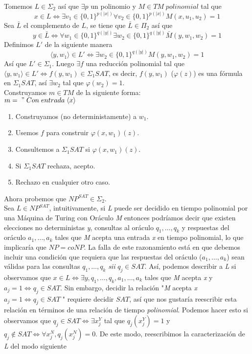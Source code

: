 \documentclass[12pt]{article}
\begin{document}
\fbox{\textbf{$\subseteq$}} Tomemos $L \in \Sigma_2$ así que $\exists p$ un polinomio y $M \in TM \; polinomial$ tal que
\begin{equation*}
x \in L \iff \exists v_1 \in \{ 0,1 \}^{p(|x|)} \forall v_2 \in \{ 0,1 \}^{p(|x|)} M(x,u_1,u_2) = 1  
\end{equation*}
Sea $\bar{L}$ el complemento de $L$, se tiene que $\bar{L} \in \Pi_2$ así que
\begin{equation*}
y \in \bar{L} \iff \forall w_1 \in \{ 0,1 \}^{q(|y|)} \exists w_2 \in \{ 0,1 \}^{q(|y|)} \bar{M}(y,w_1,w_2) = 1
\end{equation*}
Definimos $L'$ de la siguiente manera
\begin{equation*}
\langle y,w_1 \rangle \in L' \iff \exists w_2 \in \{ 0,1 \}^{q(|y|)} M(y,w_1, w_2) = 1
\end{equation*}
Así que $L' \in \Sigma_1$. Luego $\exists f$ una reducción polinomial tal que $\langle y, w_1 \rangle \in L' \iff f(y,w_1) \in \Sigma_1SAT$, es decir, $f(y,w_1)$ ($\varphi(z)$) es una fórmula en $\Sigma_1SAT$, así $\exists w_2$ tal que $\varphi(w_2) = 1$. \\
Construyamos $m \in TM$ de la siguiente forma: \\
$m = \; " \; Con \; entrada \; \langle x \rangle$ 
\begin{enumerate}
\item Construyamos (no deterministamente) a $w_1$.
\item Usemos $f$ para construir $\varphi(x,w_1)(z)$.
\item Consultemos a $\Sigma_1SAT$ si $\varphi(x,w_1)(z)$.
\item Si $\Sigma_1SAT$ rechaza, acepto.
\item Rechazo en cualquier otro caso.
\end{enumerate}
\fbox{\textbf{$\supseteq$}} Ahora probemos que $NP^{SAT} \in \Sigma_2$.\\
Sea $L \in NP^{SAT}$, intuitivamente, si \textit{L} puede ser decidido en tiempo polinomial por una Máquina de Turing con Oráculo \textit{M} entonces podríamos decir que existen elecciones no deterministas \textit{y}, consultas al oráculo $q_1, \dots, q_k$ y respuestas del oráculo $ a_1, \dots, a_k$ tales que \textit{M} acepta una entrada \textit{x} en tiempo polinomial, lo que implicaría que $NP = coNP$. La falla de este razonamiento está en que debemos incluir una condición que requiera que las respuestas del oráculo ($ a_1, \dots, a_k$) sean válidas para las consultas $q_1, \dots, q_k$ \textit{sii} $q_j \in SAT$. Así, podemos describir a \textit{L} si observamos que $x \in L \iff \exists y, q_1,\dots,q_k,a_1,\dots,a_k$ tales que \textit{M} acepta \textit{x} y $a_j = 1 \iff q_j \in SAT$. Sin embargo, decidir la relación "\textit{M} acepta \textit{x} $a_j = 1 \iff q_j \in SAT$ " requiere decidir $SAT$, así que nos gustaría reescribir esta relación en términos de una relación de tiempo \textit{polinomial}. Podemos hacer esto si observamos que $q_j \in SAT \iff \exists x^Y_j$ tal que $q_j(x^Y_j) = 1$ y $q_j \notin SAT \iff \forall x^N_j, q_j(x^N_j) = 0$. De este modo, reescribimos la caracterización de \textit{L} del modo siguiente
\end{document}

